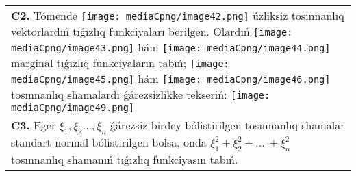 \documentclass{article}
\begin{document}
\begin{tabular}{m{17cm}}
 \\
\textbf{C2.} Tómende \texttt{[image: mediaCpng/image42.png]} úzliksiz tosınnanlıq vektorlardıń tıǵızlıq funkciyaları berilgen. Olardıń \texttt{[image: mediaCpng/image43.png]} hám \texttt{[image: mediaCpng/image44.png]} marginal tıǵızlıq funkciyaların tabıń; \texttt{[image: mediaCpng/image45.png]} hám \texttt{[image: mediaCpng/image46.png]} tosınnanlıq shamalardı ǵárezsizlikke tekseriń: \texttt{[image: mediaCpng/image49.png]}
 \\
\textbf{C3.} Eger \(\xi_{1},\xi_{2}...,\xi_{n}\) ǵárezsiz birdey bólistirilgen tosınnanlıq shamalar standart normal bólistirilgen bolsa, onda \(\xi_{1}^{2} + \xi_{2}^{2} + ...\  + \xi_{n}^{2}\) tosınnanlıq shamanıń tıǵızlıq funkciyasın tabıń.
 \\

\end{tabular}
\vspace{1cm}
\end{document}

